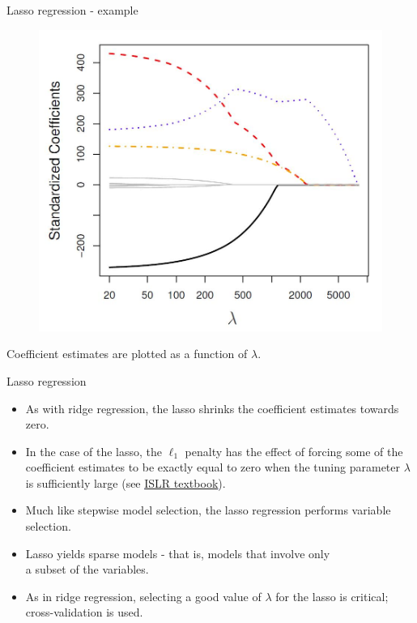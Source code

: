\documentclass{beamer}
\begin{document}
\begin{frame}{Lasso regression - example}
\vspace{-1cm}
\begin{figure}
\includegraphics[scale=0.30]{IMG/Lasso.jpg}
\end{figure}
\vspace{-0.5cm}
\centering Coefficient estimates are plotted as a function of $\lambda$.
\end{frame}
\begin{frame}{Lasso regression}
\begin{itemize}
\item As with ridge regression, the lasso shrinks the coefficient
estimates towards zero.
\medskip
\item In the case of the lasso, the $\ell_1$ penalty has the
effect of forcing some of the coefficient estimates to be
exactly equal to zero when the tuning parameter $\lambda$ is
sufficiently large (see \textcolor{blue}{\underline{\href{http://www-bcf.usc.edu/~gareth/ISL/}{ISLR textbook}}}).
\medskip
\item Much like stepwise model selection, the lasso regression performs variable selection.
\medskip
\item Lasso yields sparse models - that is, models that involve only \\a subset of the variables.
\medskip
\item As in ridge regression, selecting a good value of $\lambda$ for the
lasso is critical; cross-validation is used.
\end{itemize}
\end{frame}
\end{document}
